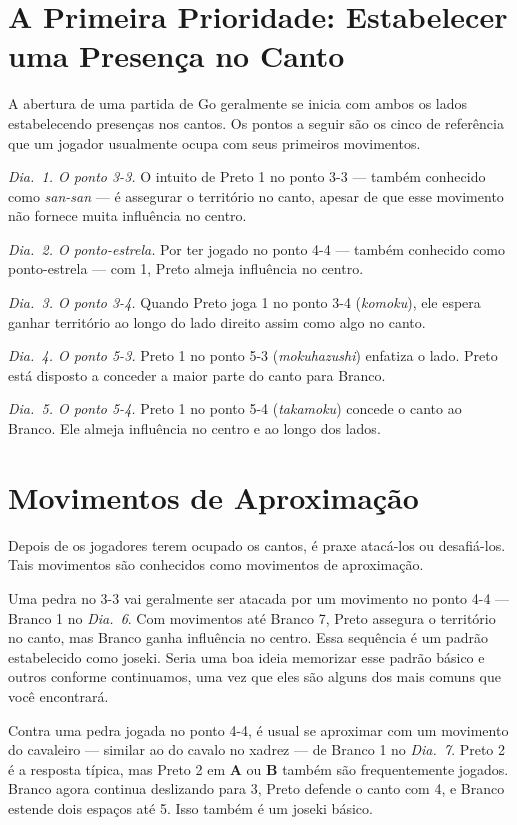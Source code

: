 \section{A Primeira Prioridade: Estabelecer uma Presença no Canto}

A abertura de uma partida de Go geralmente se inicia com ambos os lados estabelecendo presenças nos cantos. Os pontos a seguir são os cinco de referência que um jogador usualmente ocupa com seus primeiros movimentos.

\emph{Dia.\@~1. O ponto 3-3.} O intuito de Preto 1 no ponto 3-3 --- também conhecido como \emph{san-san} --- é assegurar o território no canto, apesar de que esse movimento não fornece muita influência no centro.

\emph{Dia.\@~2. O ponto-estrela.} Por ter jogado no ponto 4-4 --- também conhecido como ponto-estrela --- com 1, Preto almeja influência no centro.

\emph{Dia.\@~3. O ponto 3-4.} Quando Preto joga 1 no ponto 3-4 (\emph{komoku}), ele espera ganhar território ao longo do lado direito assim como algo no canto.

\emph{Dia.\@~4. O ponto 5-3.} Preto 1 no ponto 5-3 (\emph{mokuhazushi}) enfatiza o lado. Preto está disposto a conceder a maior parte do canto para Branco.

\emph{Dia.\@~5. O ponto 5-4.} Preto 1 no ponto 5-4 (\emph{takamoku}) concede o canto ao Branco. Ele almeja influência no centro e ao longo dos lados.

\section{Movimentos de Aproximação}

Depois de os jogadores terem ocupado os cantos, é praxe atacá-los ou desafiá-los. Tais movimentos são conhecidos como movimentos de aproximação.

Uma pedra no 3-3 vai geralmente ser atacada por um movimento no ponto 4-4 --- Branco 1 no \emph{Dia.\@~6}. Com movimentos até Branco 7, Preto assegura o território no canto, mas Branco ganha influência no centro. Essa sequência é um padrão estabelecido como joseki. Seria uma boa ideia memorizar esse padrão básico e outros conforme continuamos, uma vez que eles são alguns dos mais comuns que você encontrará.

Contra uma pedra jogada no ponto 4-4, é usual se aproximar com um movimento do cavaleiro --- similar ao do cavalo no xadrez --- de Branco 1 no \emph{Dia.\@~7}. Preto 2 é a resposta típica, mas Preto 2 em \textbf{A} ou \textbf{B} também são frequentemente jogados. Branco agora continua deslizando para 3, Preto defende o canto com 4, e Branco estende dois espaços até 5. Isso também é um joseki básico.

